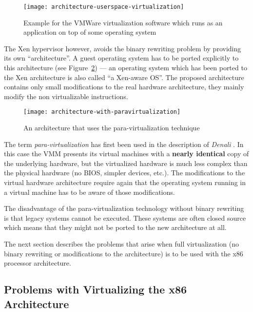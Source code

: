 \begin{figure}[htbp]
  \centering
  \texttt{[image: architecture-userspace-virtualization]}
  \caption[Virtualization  in  the   user-space]{Example  for  the  VMWare
    virtualization software  which runs as  an application on top  of some
    operating system}
  \label{fig:arch-userspace-virt}
\end{figure}

The Xen hypervisor \cite{xen} however, avoids the binary rewriting problem
by providing its own ``architecture''.  A guest operating system has to be
ported       explicitly        to       this       architecture       (see
Figure~\ref{fig:arch-para-virt})  --- an operating  system which  has been
ported to  the Xen  architecture is also  called ``a Xen-aware  OS''.  The
proposed  architecture  contains  only  small modifications  to  the  real
hardware  architecture,  \ie  they  mainly modify  the  non  virtualizable
instructions.

\begin{figure}[htbp]
  \centering
  \texttt{[image: architecture-with-paravirtualization]}
  \caption[Para-virtualization architecture]{An architecture that uses the
    para-virtualization technique}
  \label{fig:arch-para-virt}
\end{figure}

The term \emph{para-virtualization} has first been used in the description
of \emph{Denali} \cite{denali}.  In this case the VMM presents its virtual
machines with a \textbf{nearly identical} copy of the underlying hardware,
but  the virtualized  hardware  is  much less  complex  than the  physical
hardware  (no BIOS,  simpler  devices, etc.).   The  modifications to  the
virtual  hardware architecture  require  again that  the operating  system
running in a virtual machine has to be aware of those modifications.

The  disadvantage  of the  para-virtualization  technology without  binary
rewriting is  that legacy  systems cannot be  executed. These  systems are
often closed source  which means that they might not be  ported to the new
architecture at all.

The   next  section   describes  the   problems  that   arise   when  full
virtualization  (\ie   no  binary   rewriting  or  modifications   to  the
architecture) is to be used with the x86 processor architecture.

\subsection{Problems with Virtualizing the x86 Architecture}
\label{sec:x86-problems}

